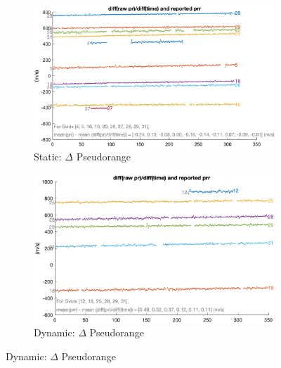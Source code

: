         \begin{figure}[H]
            \centering
            \begin{subfigure}{0.23\textwidth}
                \includegraphics[width=\textwidth]{images/tests/Monte_Cappuccini/png/Samsung_A51_Monte_Cappuccini_fig2.png}
                \caption{Static: $\Delta$ Pseudorange}
            \end{subfigure}
            \hfill
            \begin{subfigure}{0.23\textwidth}
                \includegraphics[width=\textwidth]{images/tests/Tram_15_trip_Castello_to_Pescatore/filtered/Samsung_A51_Tram_15_trip_Castello_to_Pescatore_fig2.png}
                \caption{Dynamic: $\Delta$ Pseudorange}
            \end{subfigure}
        \end{figure}
    
